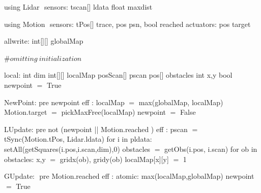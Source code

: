 using Lidar $\label{lidardef}$
    sensors:
       tscan[] ldata 
       float maxdist

using Motion $\label{moddef}$
    sensors:
        tPos[] trace, pos psn,
        bool reached
    actuators:
       pos target

allwrite:$\label{awvar}$
    int[][] globalMap 
    
#$\mathit{omitting\ initialization}$

local:
   int dim
   int[][] localMap 
   posScan[] pscan
   pos[] obstacles
   int x,y
   bool newpoint $=$ True
   
NewPoint:$\label{newpt}$
  pre newpoint
  eff : localMap $=$ max(globalMap, localMap)
        Motion.target $=$ pickMaxFree(localMap)
        newpoint $=$ False

LUpdate:$\label{lup}$
   pre not (newpoint || Motion.reached )
   eff : pscan $=$ tSync(Motion.tPos, Lidar.ldata)
         for i in pldata:
           setAll(getSquares(i.pos,i.scan,dim),0)
             obstacles $=$ getObs(i.pos, i.scan)
             for ob in obstacles:
                 x,y $=$ gridx(ob), gridy(ob)
                 localMap[x][y] $=$ 1
    
GUpdate: $\label{gup}$
  pre Motion.reached
  eff : atomic:
           max(localMap,globalMap)
        newpoint $=$ True